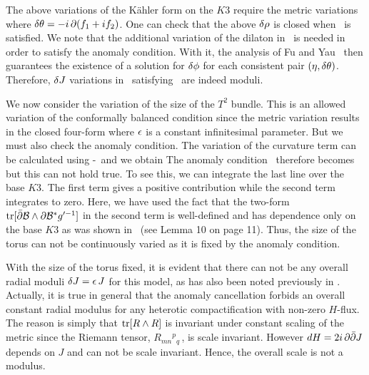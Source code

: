 The above variations of the K\"ahler form on the $K3$ require the
metric variations \eqn{} where $\delta\theta = -i\,\partial(f_1+ i f_2)$.  One can check
that the above $\delta \rho$ is closed when \curvart\ is satisfied.
We note that the additional variation of the dilaton in \Kmetv\ is
needed in order to satisfy the anomaly condition.  With it, the
analysis of Fu and Yau \FY\ then guarantees the existence of a
solution for $\delta \phi$ for each consistent pair $(\eta, \delta \theta)$.
Therefore, $\delta J$ variations in \Kmetv\ satisfying \curvari\  are
indeed moduli.





We now consider the variation of the size of the $T^2$ bundle.
This is an allowed variation of the conformally balanced condition
since the metric variation \eqn{} results in the closed four-form \eqn{} where $\epsilon$ is a constant infinitesimal parameter.  But we
must also check the anomaly condition. The variation of the
curvature term can be calculated using  \traa-\trcc\ and we obtain
\eqn{}
The anomaly condition \anomtt\ therefore becomes
\eqn{} but this can not hold true. To see this, we can
integrate the last line over the base $K3$.  The first term gives
a positive contribution while the second term integrates to zero.
Here, we have used the fact that the two-form ${\rm tr} [{\bar \partial} {\cal B}\wedge
\partial {\cal B}^* g'^{-1}]$ in the second term is well-defined and has
dependence only on the base $K3$ as was shown in \FY\ (see Lemma
10 on page 11). Thus, the size of the torus can not be
continuously varied as it is fixed by the anomaly condition.

With the size of the torus fixed, it is evident that there can not
be any overall radial moduli $\delta J = \epsilon\,J$ for this model, as has
also been noted previously in .  Actually,
it is true in general that the anomaly cancellation forbids an
overall constant radial modulus for any heterotic compactification
with non-zero $H$-flux. The reason is simply that ${\rm tr} [R\wedge
R]$ is invariant under constant scaling of the metric since the
Riemann tensor, $R_{mn}{}^p{}_q\,$, is scale invariant. However
$dH= 2i\,\partial{\bar \partial} J$ depends on $J$ and can not be scale invariant.
Hence, the overall scale is not a modulus.


